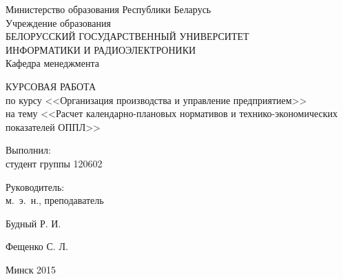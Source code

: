 \begin{titlepage}
\thispagestyle{empty}
\setlength{\parindent}{0mm} %

\begin{center}
  Министерство образования Республики Беларусь \\
  \bigskip
  Учреждение образования \\
  БЕЛОРУССКИЙ ГОСУДАРСТВЕННЫЙ УНИВЕРСИТЕТ \\
  ИНФОРМАТИКИ И РАДИОЭЛЕКТРОНИКИ \\
  \bigskip
  \bigskip
  Кафедра менеджмента
\end{center}

\vspace{50mm}

\begin{center}
  {\LARGE КУРСОВАЯ РАБОТА} \\
  по курсу <<Организация производства и управление предприятием>> \\
  на тему <<Расчет календарно-плановых нормативов и
  технико-экономических показателей ОППЛ>>\\
\end{center}

\vspace{30mm}

\begin{minipage}{.65\linewidth}
    Выполнил: \\
    студент группы 120602 

    \bigskip

    Руководитель: \\
    м.~э.~н., преподаватель
\end{minipage}
\hfill
\begin{minipage}{.25\linewidth}
  \vspace{6mm}
  Будный Р. И.

  \vspace{12mm}
  Фещенко С. Л.
\end{minipage}

\vspace{45mm}
\begin{center}
  Минск 2015
\end{center}

\setlength{\parindent}{5ex} %
\end{titlepage}